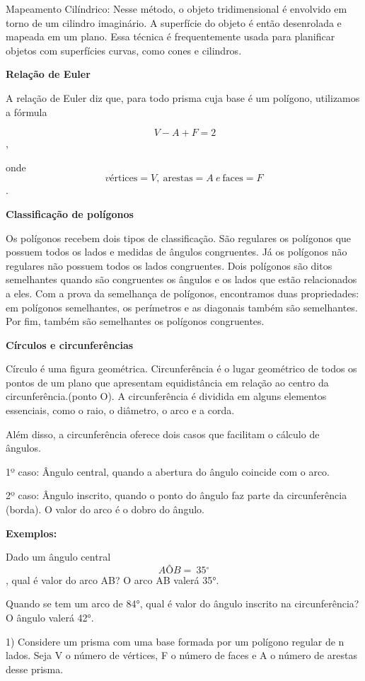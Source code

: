 Mapeamento Cilíndrico: Nesse método, o objeto tridimensional é envolvido
em torno de um cilindro imaginário. A superfície do objeto é então
desenrolada e mapeada em um plano. Essa técnica é frequentemente usada
para planificar objetos com superfícies curvas, como cones e cilindros.

\textbf{Relação de Euler}

A relação de Euler diz que, para todo prisma cuja base é um polígono,
utilizamos a fórmula

\[\ V - A + F = 2\],

onde \[vé\text{rtices} = V,\ \text{arestas} = A\ e\ \text{faces} = F\] .

\textbf{Classificação de polígonos~}

Os polígonos recebem dois tipos de classificação. São regulares os
polígonos que possuem todos os lados e medidas de ângulos congruentes.
Já os polígonos não regulares não possuem todos os lados congruentes.
Dois polígonos são ditos semelhantes quando são congruentes os ângulos e
os lados que estão relacionados a eles. Com a prova da semelhança de
polígonos, encontramos duas propriedades: em polígonos semelhantes, os
perímetros e as diagonais também são semelhantes. Por fim, também são
semelhantes os polígonos congruentes.~~

\textbf{Círculos e circunferências~}

Círculo é uma figura geométrica. Circunferência é o lugar geométrico de
todos os pontos de um plano que apresentam equidistância em relação ao
centro da circunferência.(ponto O). A circunferência é dividida em
alguns elementos essenciais, como o raio, o diâmetro, o arco e a corda.

Além disso, a circunferência oferece dois casos que facilitam o cálculo
de ângulos.~

1º caso: Ângulo central, quando a abertura do ângulo coincide com o
arco.

2º caso: Ângulo inscrito, quando o ponto do ângulo faz parte da
circunferência (borda). O valor do arco é o dobro do ângulo.

\textbf{Exemplos:}

Dado um ângulo central \[AÔB = \ 35{^\circ}\], qual é valor do arco AB?
O arco AB valerá 35°.

Quando se tem um arco de 84°, qual é valor do ângulo inscrito na
circunferência? O ângulo valerá 42°.


1) Considere um prisma com uma base formada por um polígono regular de n
lados. Seja V o número de vértices, F o número de faces e A o número de
arestas desse prisma.

